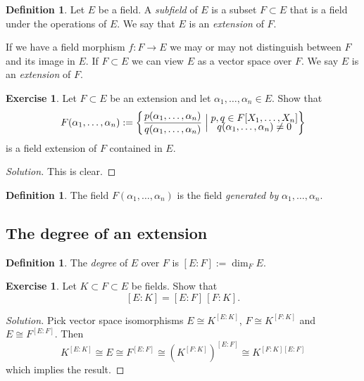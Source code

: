 \documentclass[11pt]{amsart}
\theoremstyle{definition}
\newtheorem{defi}[theo]{Definition}
\newtheorem{e}[theo]{Exercise}
\newenvironment{s}{\begin{proof}[Solution]}{\end{proof}}
\begin{document}
\begin{defi}
Let $E$ be a field.
A \emph{subfield} of $E$ is a subset $F \subset E$ that is a field under the operations of $E$.
We say that $E$ is an \emph{extension} of $F$.
\end{defi}

If we have a field morphism $f : F \to E$ we may or may not distinguish between $F$ and its image in $E$.
If $F \subset E$ we can view $E$ as a vector space over $F$.
We say $E$ is an \emph{extension} of $F$.


\begin{e}
Let $F \subset E$ be an extension and let $\alpha_1, \ldots, \alpha_n \in E$.
Show that 
\[
F(\alpha_1, \ldots, \alpha_n)
:= \biggl\{
\frac{p(\alpha_1, \ldots, \alpha_n)}{q(\alpha_1, \ldots, \alpha_n)}
\Bigm|
\begin{gathered}
p,q \in F[X_1, \ldots, X_n]\\[-6pt]
q(\alpha_1, \ldots, \alpha_n) \not= 0
\end{gathered}
\biggr\}
\]
is a field extension of $F$ contained in $E$.
\end{e}

\begin{s}
This is clear.
\end{s}

\begin{defi}
The field $F(\alpha_1, \ldots, \alpha_n)$ is the field \emph{generated by} $\alpha_1, \ldots, \alpha_n$.
\end{defi}


\subsection*{The degree of an extension}

\begin{defi}
The \emph{degree} of $E$ over $F$ is $[E:F] := \dim_F E$.
\end{defi}


\begin{e}
Let $K \subset F \subset E$ be fields.
Show that
\[
[E:K] = [E:F] \, [F:K].
\]
\end{e}

\begin{s}
Pick vector space isomorphisms $E \cong K^{[E:K]}$, $F \cong K^{[F:K]}$ and $E \cong F^{[E:F]}$.
Then
\[
K^{[E:K]}
\cong E
\cong F^{[E:F]}
\cong (K^{[F:K]})^{[E:F]}
\cong K^{[F:K][E:F]}
\]
which implies the result.
\end{s}
\end{document}

